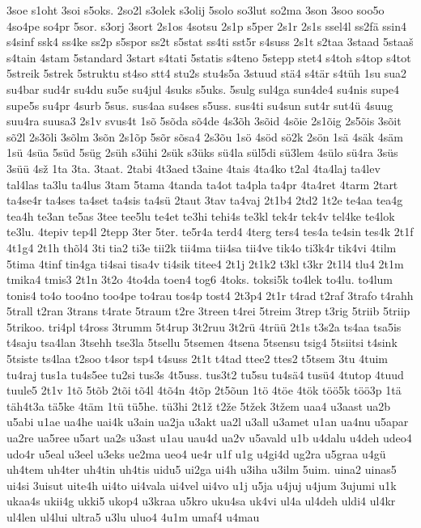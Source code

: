 {3soe
s1oht
3soi
s5oks.
2so2l
s3olek
s3olij
5solo
so3lut
so2ma
3son
3soo
soo5o
4so4pe
so4pr
5sor.
s3orj
3sort
2s1os
4sotsu
2s1p
s5per
2s1r
2s1s
ssel4l
ss2fä
ssin4
s4sinf
ssk4
ss4ke
ss2p
s5spor
ss2t
s5stat
ss4ti
sst5r
s4suss
2s1t
s2taa
3staad
5staaš
s4tain
4stam
5standard
3start
s4tati
5statis
s4teno
5stepp
stet4
s4toh
s4top
s4tot
5streik
5strek
5struktu
st4so
stt4
stu2s
stu4s5a
3stuud
stä4
s4tär
s4tüh
1su
sua2
su4bar
sud4r
su4du
su5e
su4jul
4suks
s5uks.
5sulg
sul4ga
sun4de4
su4nis
supe4
supe5s
su4pr
4surb
5sus.
sus4aa
su4ses
s5uss.
sus4ti
su4sun
sut4r
sut4ü
4suug
suu4ra
suusa3
2s1v
svus4t
1sõ
5sõda
sõ4de
4s3õh
3sõid
4sõie
2s1õig
2s5õis
3sõit
sõ2l
2s3õli
3sõlm
3sõn
2s1õp
5sõr
sõsa4
2s3õu
1sö
4söd
sö2k
2sön
1sä
4säk
4säm
1sü
4süa
5süd
5süg
2süh
s3ühi
2sük
s3üks
sü4la
sül5di
sü3lem
4sülo
sü4ra
3süs
3süü
4sž
1ta
3ta.
3taat.
2tabi
4t3aed
t3aine
4tais
4ta4ko
t2al
4ta4laj
ta4lev
tal4las
ta3lu
ta4lus
3tam
5tama
4tanda
ta4ot
ta4pla
ta4pr
4ta4ret
4tarm
2tart
ta4se4r
ta4ses
ta4set
ta4sis
ta4sü
2taut
3tav
ta4vaj
2t1b4
2td2
1t2e
te4aa
tea4g
tea4h
te3an
te5as
3tee
tee5lu
te4et
te3hi
tehi4s
te3kl
tek4r
tek4v
tel4ke
te4lok
te3lu.
4tepiv
tep4l
2tepp
3ter
5ter.
te5r4a
terd4
4terg
ters4
tes4a
te4sin
tes4k
2t1f
4t1g4
2t1h
thõl4
3ti
tia2
ti3e
tii2k
tii4ma
tii4sa
tii4ve
tik4o
ti3k4r
tik4vi
4tilm
5tima
4tinf
tin4ga
ti4sai
tisa4v
ti4sik
titee4
2t1j
2t1k2
t3kl
t3kr
2t1l4
tlu4
2t1m
tmika4
tmis3
2t1n
3t2o
4to4da
toen4
tog6
4toks.
toksi5k
to4lek
to4lu.
to4lum
tonis4
to4o
too4no
too4pe
to4rau
tos4p
tost4
2t3p4
2t1r
t4rad
t2raf
3trafo
t4rahh
5trall
t2ran
3trans
t4rate
5traum
t2re
3treen
t4rei
5treim
3trep
t3rig
5triib
5triip
5trikoo.
tri4pl
t4ross
3trumm
5t4rup
3t2ruu
3t2rü
4trüü
2t1s
t3s2a
ts4aa
tsa5is
t4saju
tsa4lan
3tsehh
tse3la
5tsellu
5tsemen
4tsena
5tsensu
tsig4
5tsiitsi
t4sink
5tsiste
ts4laa
t2soo
t4sor
tsp4
t4suss
2t1t
t4tad
ttee2
ttes2
t5tsem
3tu
4tuim
tu4raj
tus1a
tu4s5ee
tu2si
tus3s
4t5uss.
tus3t2
tu5su
tu4sä4
tusü4
4tutop
4tuud
tuule5
2t1v
1tõ
5tõb
2tõi
tõ4l
4tõ4n
4tõp
2t5õun
1tö
4töe
4tök
töö5k
töö3p
1tä
täh4t3a
tä5ke
4täm
1tü
tü5he.
tü3hi
2t1ž
t2že
5tžek
3tžem
uaa4
u3aast
ua2b
u5abi
u1ae
ua4he
uai4k
u3ain
ua2ja
u3akt
ua2l
u3all
u3amet
u1an
ua4nu
u5apar
ua2re
ua5ree
u5art
ua2s
u3ast
u1au
uau4d
ua2v
u5avald
u1b
u4dalu
u4deh
udeo4
udo4r
u5eal
u3eel
u3eks
ue2ma
ueo4
ue4r
u1f
u1g
u4gi4d
ug2ra
u5graa
u4gü
uh4tem
uh4ter
uh4tin
uh4tis
uidu5
ui2ga
ui4h
u3iha
u3ilm
5uim.
uina2
uinas5
ui4si
3uisut
uite4h
ui4to
ui4vala
ui4vel
ui4vo
u1j
u5ja
u4juj
u4jum
3ujumi
u1k
ukaa4s
ukii4g
ukki5
ukop4
u3kraa
u5kro
uku4sa
uk4vi
ul4a
ul4deh
uldi4
ul4kr
ul4len
ul4lui
ultra5
u3lu
uluo4
4u1m
umaf4
u4mau
}
